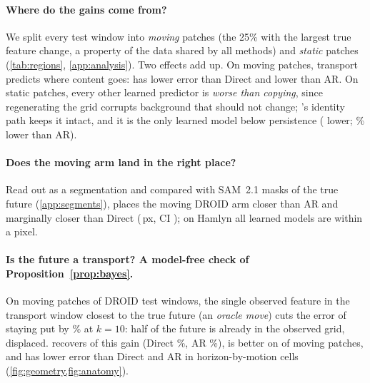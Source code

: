 \paragraph{Where do the gains come from?} We split every test window into \emph{moving} patches (the 25\% with the
largest true feature change, a property of the data shared by all methods) and \emph{static} patches
(\cref{tab:regions}, \cref{app:analysis}). Two effects add up. On moving patches, transport predicts where content goes:
\ours{} has \good{\droidMovingVsDirect\%} lower error than Direct and \good{\droidMovingVsAR\%} lower than AR. On static
patches, every other learned predictor is \emph{worse than copying}, since regenerating the grid corrupts background
that should not change; \ours{}'s identity path keeps it intact, and it is the only learned model below persistence
(\good{\droidStaticVsPers\%} lower; \droidStaticVsAR\% lower than AR).

\paragraph{Does the moving arm land in the right place?} Read out as a segmentation and compared with SAM~2.1 masks of the
true future (\cref{app:segments}), \ours{} places the moving DROID arm  closer than AR and
marginally closer than Direct (\segDroidPlaceRedDi{}\,px, CI \segDroidPlaceRedDiCI{}); on Hamlyn all learned models are within a pixel.

\paragraph{Is the future a transport? A model-free check of Proposition~\ref{prop:bayes}.} On moving patches of
\geoWindows{} DROID test windows, the single observed feature in the transport window closest to the true future (an
\emph{oracle move}) cuts the error of staying put by \geoOracleRed\% at $k{=}10$: half of the future is
already in the observed grid, displaced. \ours{} recovers \good{\geoShareShift\%} of this gain (Direct \geoShareDirect\%,
AR \geoShareAR\%), is better on \good{\geoWinDirect\%} of moving patches, and has lower error than Direct and AR in
 horizon-by-motion cells (\cref{fig:geometry,fig:anatomy}).
